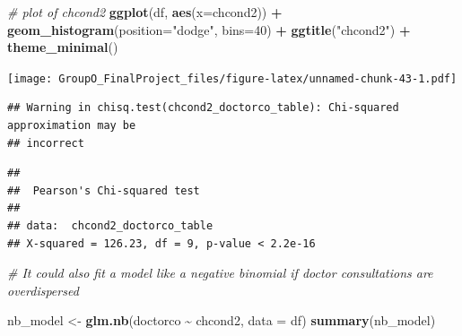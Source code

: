 \documentclass[
]{article}
\newenvironment{Shaded}{\begin{snugshade}}{\end{snugshade}}
\newcommand{\AttributeTok}[1]{\textcolor[rgb]{0.13,0.29,0.53}{#1}}
\newcommand{\CommentTok}[1]{\textcolor[rgb]{0.56,0.35,0.01}{\textit{#1}}}
\newcommand{\DecValTok}[1]{\textcolor[rgb]{0.00,0.00,0.81}{#1}}
\newcommand{\FunctionTok}[1]{\textcolor[rgb]{0.13,0.29,0.53}{\textbf{#1}}}
\newcommand{\NormalTok}[1]{#1}
\newcommand{\OtherTok}[1]{\textcolor[rgb]{0.56,0.35,0.01}{#1}}
\newcommand{\SpecialCharTok}[1]{\textcolor[rgb]{0.81,0.36,0.00}{\textbf{#1}}}
\newcommand{\StringTok}[1]{\textcolor[rgb]{0.31,0.60,0.02}{#1}}
\begin{document}
\begin{Shaded}
\begin{Highlighting}[]
\CommentTok{\# plot of chcond2}
\FunctionTok{ggplot}\NormalTok{(df, }\FunctionTok{aes}\NormalTok{(}\AttributeTok{x=}\NormalTok{chcond2)) }\SpecialCharTok{+}
  \FunctionTok{geom\_histogram}\NormalTok{(}\AttributeTok{position=}\StringTok{"dodge"}\NormalTok{, }\AttributeTok{bins=}\DecValTok{40}\NormalTok{) }\SpecialCharTok{+}
  \FunctionTok{ggtitle}\NormalTok{(}\StringTok{"chcond2"}\NormalTok{) }\SpecialCharTok{+}
  \FunctionTok{theme\_minimal}\NormalTok{()}
\end{Highlighting}
\end{Shaded}

\texttt{[image: GroupO\_FinalProject\_files/figure-latex/unnamed-chunk-43-1.pdf]}

\begin{Shaded}
\end{Shaded}

\begin{verbatim}
## Warning in chisq.test(chcond2_doctorco_table): Chi-squared approximation may be
## incorrect
\end{verbatim}

\begin{verbatim}
## 
##  Pearson's Chi-squared test
## 
## data:  chcond2_doctorco_table
## X-squared = 126.23, df = 9, p-value < 2.2e-16
\end{verbatim}

\begin{Shaded}
\begin{Highlighting}[]
\CommentTok{\# It could also fit a model like a negative binomial if doctor consultations are overdispersed}

\NormalTok{nb\_model }\OtherTok{\textless{}{-}} \FunctionTok{glm.nb}\NormalTok{(doctorco }\SpecialCharTok{\textasciitilde{}}\NormalTok{ chcond2, }\AttributeTok{data =}\NormalTok{ df)}
\FunctionTok{summary}\NormalTok{(nb\_model)}
\end{Highlighting}
\end{Shaded}
\end{document}
